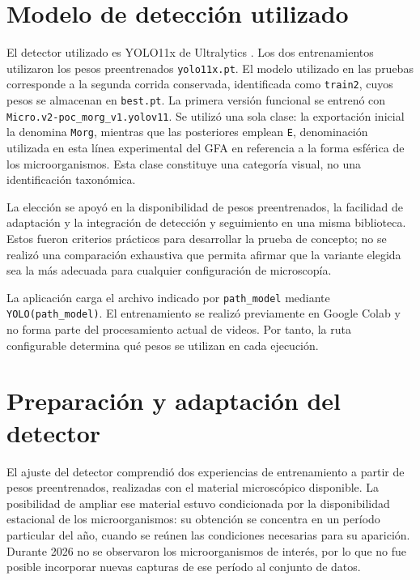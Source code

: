 \section{Modelo de detección utilizado}

El detector utilizado es YOLO11x de Ultralytics \cite{jocher2024}. Los dos entrenamientos utilizaron los pesos preentrenados \texttt{yolo11x.pt}. El modelo utilizado en las pruebas corresponde a la segunda corrida conservada, identificada como \texttt{train2}, cuyos pesos se almacenan en \texttt{best.pt}. La primera versión funcional se entrenó con \nolinkurl{Micro.v2-poc_morg_v1.yolov11}. Se utilizó una sola clase: la exportación inicial la denomina \texttt{Morg}, mientras que las posteriores emplean \texttt{E}, denominación utilizada en esta línea experimental del GFA en referencia a la forma esférica de los microorganismos. Esta clase constituye una categoría visual, no una identificación taxonómica.

La elección se apoyó en la disponibilidad de pesos preentrenados, la facilidad de adaptación y la integración de detección y seguimiento en una misma biblioteca. Estos fueron criterios prácticos para desarrollar la prueba de concepto; no se realizó una comparación exhaustiva que permita afirmar que la variante elegida sea la más adecuada para cualquier configuración de microscopía.

La aplicación carga el archivo indicado por \texttt{path\_model} mediante \texttt{YOLO(path\_model)}. El entrenamiento se realizó previamente en Google Colab y no forma parte del procesamiento actual de videos. Por tanto, la ruta configurable determina qué pesos se utilizan en cada ejecución.

\section{Preparación y adaptación del detector}
\label{sec:preparacion-detector}

El ajuste del detector comprendió dos experiencias de entrenamiento a partir de pesos preentrenados, realizadas con el material microscópico disponible. La posibilidad de ampliar ese material estuvo condicionada por la disponibilidad estacional de los microorganismos: su obtención se concentra en un período particular del año, cuando se reúnen las condiciones necesarias para su aparición. Durante 2026 no se observaron los microorganismos de interés, por lo que no fue posible incorporar nuevas capturas de ese período al conjunto de datos.

